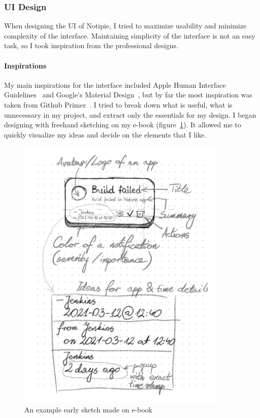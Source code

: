 \subsubsection{UI Design}\label{sec:ui-design}

When designing the \ac{UI} of Notipie,
I tried to maximize usability
and minimize complexity of the interface.
Maintaining simplicity of the interface is not an easy task,
so I took inspiration from the professional designs.

\paragraph*{Inspirations}\label{sec:inspirations}

My main inspirations for the interface included
Apple Human Interface Guidelines~\cite{apple_inc_human_2022}
and Google's Material Design~\cite{google_llc_material_2022},
but by far the most inspiration was taken from
Github Primer~\cite{github_inc_primer_2022}.
I tried to break down what is useful,
what is unnecessary in my project,
and extract only the essentials for my design.
I began designing with freehand sketching
on my e-book (figure~\ref{fig:early-ui-sketches}).
It allowed me to quickly visualize my ideas
and decide on the elements that I like.

\begin{figure}[ht]
  \centering
  \includegraphics[width=10cm,keepaspectratio]{img/early_ui_sketches.png}
  \caption{An example early sketch made on e-book}
  \label{fig:early-ui-sketches}
\end{figure}

